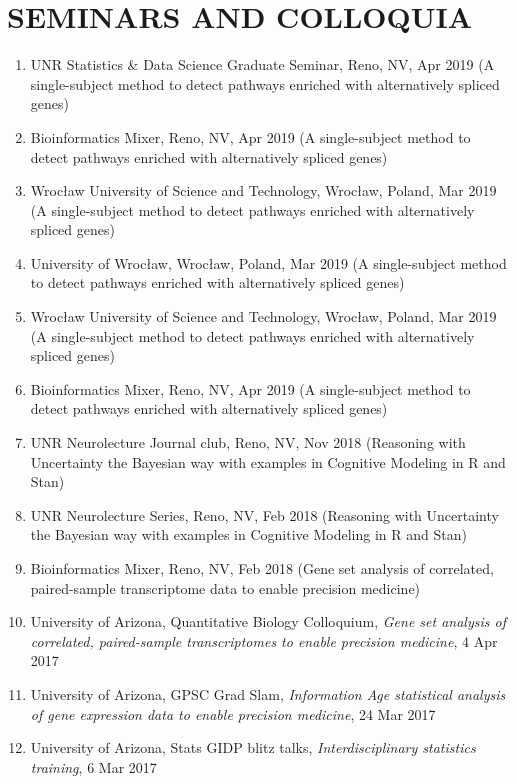 \documentclass[paper=a4,fontsize=11pt]{scrartcl} %
\newcommand{\NewPart}[2]{\section*{\uppercase{#1} #2 }}
\newcommand{\TalkEntry}[4]{
		\noindent #1, #2, #3 #4}
\begin{document}
\NewPart{Seminars and Colloquia}{}

\vspace{-7pt}
\begin{enumerate}

\item\TalkEntry{UNR Statistics \& Data Science Graduate Seminar}{Reno, NV}{Apr 2019}{(A single-subject method to detect pathways enriched with alternatively spliced genes)}
  
\item\TalkEntry{Bioinformatics Mixer}{Reno, NV}{Apr 2019}{(A single-subject method to detect pathways enriched with alternatively spliced genes)}

\item\TalkEntry{Wrocław University of Science and Technology}{Wrocław, Poland}{Mar 2019}{(A single-subject method to detect pathways enriched with alternatively spliced genes)}

  \item\TalkEntry{University of Wrocław}{Wrocław, Poland}{Mar 2019}{(A single-subject method to detect pathways enriched with alternatively spliced genes)}

  \item\TalkEntry{Wrocław University of Science and Technology}{Wrocław, Poland}{Mar 2019}{(A single-subject method to detect pathways enriched with alternatively spliced genes)}

  \item\TalkEntry{Bioinformatics Mixer}{Reno, NV}{Apr 2019}{(A single-subject method to detect pathways enriched with alternatively spliced genes)}
  
  \item\TalkEntry{UNR Neurolecture Journal club}{Reno, NV}{Nov 2018}{(Reasoning with Uncertainty the Bayesian way with examples in Cognitive Modeling in R and Stan)}
  
  \item\TalkEntry{UNR Neurolecture Series}{Reno, NV}{Feb 2018}{(Reasoning with Uncertainty the Bayesian way with examples in Cognitive Modeling in R and Stan)}

\item\TalkEntry{Bioinformatics Mixer}{Reno, NV}{Feb 2018}{(Gene set analysis of correlated, paired-sample transcriptome data to enable precision medicine)}
  
\item\TalkEntry{University of Arizona, Quantitative Biology Colloquium}{\textit{Gene set analysis of correlated, paired-sample transcriptomes to enable precision medicine}}{4 Apr 2017}{}  
  \item\TalkEntry{University of Arizona, GPSC Grad Slam}{\textit{Information Age statistical analysis of gene expression data to enable precision medicine}}{24 Mar 2017}{}
\item\TalkEntry{University of Arizona, Stats GIDP blitz talks}{\textit{Interdisciplinary statistics training}}{6 Mar 2017}{}


\end{enumerate}
\end{document}
